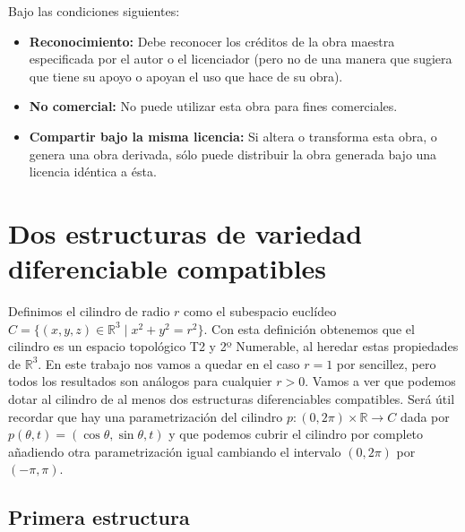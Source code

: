 \documentclass[twoside, 11pt]{article}
\theoremstyle{definition}
\newcommand{\R}{\mathbb{R}}
\begin{document}
\begin{titlepage}
{Bajo las condiciones siguientes:
\begin{itemize}
 \item {\bf Reconocimiento:} Debe reconocer los créditos de la obra maestra especificada por el autor o el licenciador (pero no de una manera que sugiera que tiene su apoyo o apoyan el uso que hace de su obra).
 \item {\bf No comercial:} No puede utilizar esta obra para fines comerciales.
\item {\bf Compartir bajo la misma licencia:} Si altera o transforma esta obra, o genera una obra derivada, sólo puede distribuir la obra generada bajo una licencia idéntica a ésta.
\end{itemize}}

	
\end{titlepage}

\tableofcontents

\newpage

\section{Dos estructuras de variedad diferenciable compatibles}

Definimos el cilindro de radio $r$ como el subespacio euclídeo $C=\{(x,y,z)\in\R^3\mid x^2+y^2=r^2\}$. Con esta definición obtenemos que el cilindro es un espacio topológico T2 y 2º Numerable, al heredar estas propiedades de $\R^3$.  En este trabajo nos vamos a quedar en el caso $r=1$ por sencillez, pero todos los resultados son análogos para cualquier $r>0$. Vamos a ver que podemos dotar al cilindro de al menos dos estructuras diferenciables compatibles. Será útil recordar que hay una parametrización del cilindro $p:(0,2\pi)\times\R\to C$ dada por $p(\theta,t)=(\cos\theta,\sin\theta, t)$ y que podemos cubrir el cilindro por completo añadiendo otra parametrización igual cambiando el intervalo $(0,2\pi)$ por $(-\pi,\pi)$. 

\subsection{Primera estructura}
\end{document}
